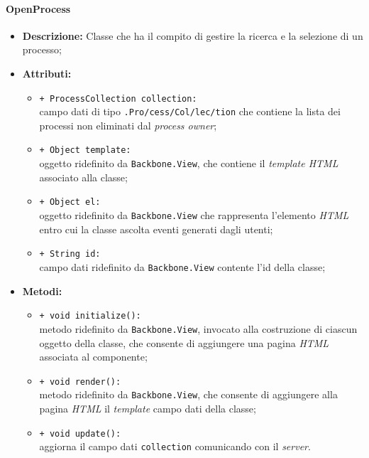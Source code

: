 \paragraph{OpenProcess}
\begin{flushleft}
\begin{itemize}
\item \textbf{Descrizione:} Classe che ha il compito di gestire la ricerca e la selezione di un processo;
\item \textbf{Attributi:}
\begin{sloppypar}
\begin{itemize}
\item \texttt{+ ProcessCollection collection:}\\ campo dati di tipo \texttt{\collection{}.Pro\fshyp{}cess\fshyp{}Col\fshyp{}lec\fshyp{}tion} che contiene la lista dei processi non eliminati dal \textit{process owner};
\item \texttt{+ Object template:}\\ oggetto ridefinito da \texttt{Backbone.View}, che contiene il \textit{template HTML} associato alla classe;
\item \texttt{+ Object el:}\\ oggetto ridefinito da \texttt{Backbone.View} che rappresenta l'elemento \textit{HTML} entro cui la classe ascolta eventi generati dagli utenti;
\item \texttt{+ String id:}\\ campo dati ridefinito da \texttt{Backbone.View} contente l'id della classe;
\end{itemize}
\end{sloppypar}
\item \textbf{Metodi:}
\begin{sloppypar}
\begin{itemize}
\item \texttt{+ void initialize():}\\ metodo ridefinito da \texttt{Backbone.View}, invocato alla costruzione di ciascun oggetto della classe, che consente di aggiungere una pagina \textit{HTML} associata al componente;
\item \texttt{+ void render():}\\ metodo ridefinito da \texttt{Backbone.View}, che consente di aggiungere alla pagina \textit{HTML} il \textit{template} campo dati della classe;
\item \texttt{+ void update():}\\ aggiorna il campo dati \texttt{collection} comunicando con il \textit{server}.
\end{itemize}
\end{sloppypar}
\end{itemize}
\end{flushleft}


